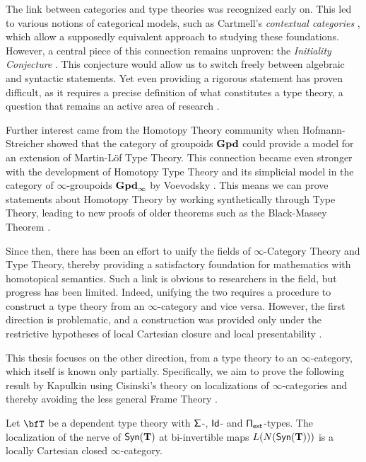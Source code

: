 The link between categories and type theories was recognized early on. This led to various notions of categorical models, such as
Cartmell's \emph{contextual categories} \cite{Car78}, which allow a supposedly
equivalent approach to studying these foundations. However, a central piece of this
connection remains unproven: the \emph{Initiality Conjecture}
\cite{Str91}.
This conjecture would allow us to switch freely between algebraic and syntactic statements.
Yet even providing a rigorous statement has proven difficult, as it requires
a precise definition of what constitutes a type theory, a question that remains an active area of research \cite{BHL20}.

Further interest came from the Homotopy Theory community when
Hofmann-Streicher \cite{HS98} showed that the category of groupoids $\operatorname{\mathbf{Gpd}}$ could
provide a model for an extension of Martin-L{\"o}f Type Theory. This connection
became even stronger with the development of Homotopy Type Theory and its
simplicial model in the category of $\infty$-groupoids $\operatorname{\mathbf{Gpd}_\infty}$ by
Voevodsky \cite{KL12}. This means we can prove statements about Homotopy
Theory by working synthetically through Type Theory, leading to new proofs of
older theorems such as the Black-Massey Theorem \cite{HFLL16}. 

Since then, there has
been an effort to unify the
fields of $\infty$-Category Theory and Type Theory, thereby providing a
satisfactory foundation for mathematics with homotopical semantics. Such a link is
obvious to researchers in the field, but progress has been limited.
Indeed, unifying the two requires a procedure to construct a type
theory from an $\infty$-category and vice versa. However, the first direction is
problematic, and a construction was provided only under the restrictive hypotheses of
local Cartesian closure and local presentability \cite{Shu14}.

This thesis focuses on the other direction, from a type theory to an
$\infty$-category, which itself is known only partially. Specifically, we aim to
prove the following result by Kapulkin \cite[Thm.\ 9.3.17]{Kap14} using
Cisinski's theory on localizations of $\infty$-categories \cite{Cis19} and
thereby avoiding the less general Frame Theory \cite{Szu14,KS15}.

\begin{finalthm}
  Let $\bfT$ be a dependent type theory with $\operatorname{\mathsf{\Sigma}}$-, $\operatorname{\mathsf{Id}}$- and
  $\operatorname{\mathsf{\Pi_{ext}}}$-types. The localization of the nerve of $\mathsf{Syn}(\mathbf{T})$ at bi-invertible
  maps $L(N(\mathsf{Syn}(\mathbf{T})))$ is a locally Cartesian closed $\infty$-category.
\end{finalthm}

